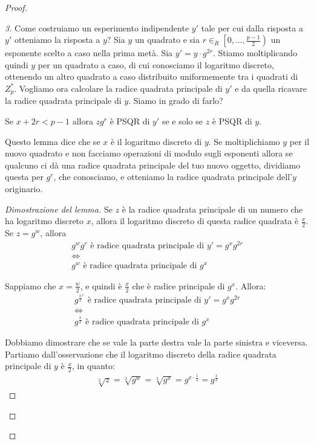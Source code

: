 \begin{proof}
\begin{proof}[3]
Come costruiamo un esperimento indipendente $y'$ tale per cui dalla risposta a $y'$ otteniamo la risposta a $y$? Sia $y$ un quadrato e sia $r \in_R \left[ 0, ..., \frac{p-1}{2}\right)$ un esponente scelto a caso nella prima metà. Sia $y' = y\cdot g^{2r}$. Stiamo moltiplicando quindi $y$ per un quadrato a caso, di cui conosciamo il logaritmo discreto, ottenendo un altro quadrato a caso distribuito uniformemente tra i quadrati di $Z_p^*$. Vogliamo ora calcolare la radice quadrata principale di $y'$ e da quella ricavare la radice quadrata principale di $y$. Siamo in grado di farlo? 
\begin{lemma}
Se $x + 2r < p-1$ allora $zg^r$ è PSQR di $y'$ se e solo se $z$ è PSQR di $y$.
\end{lemma}
\noindent Questo lemma dice che se $x$ è il logaritmo discreto di $y$. Se moltiplichiamo $y$ per il nuovo quadrato e non facciamo operazioni di modulo sugli esponenti allora se qualcuno ci dà una radice quadrata principale del tuo nuovo oggetto, dividiamo questa per $g^r$, che conosciamo, e otteniamo la radice quadrata principale dell'$y$ originario. 

\begin{proof}[Dimostrazione del lemma]
Se $z$ è la radice quadrata principale di un numero che ha logaritmo discreto $x$, allora il logaritmo discreto di questa radice quadrata è $\frac{x}{2}$. Se $z = g^w$, allora 
\begin{align*}
    g^wg^r \text{ è radice quadrata principale di } y' = g^xg^{2r}\\
    \Longleftrightarrow\\
    g^w \text{ è radice quadrata principale di } g^x
\end{align*}

\noindent Sappiamo che $x = \frac{w}{2}$, e quindi è $\frac{x}{2}$ che è radice principale di $g^x$. Allora: 
\begin{align*}
    g^\frac{x}{2}^r \text{ è radice quadrata principale di } y' = g^xg^{2r}\\
    \Longleftrightarrow\\
    g^\frac{x}{2} \text{ è radice quadrata principale di } g^x
\end{align*}



Dobbiamo dimostrare che se vale la parte destra vale la parte sinistra e viceversa. Partiamo dall'osservazione che il logaritmo discreto della radice quadrata principale di $y$ è $\frac{x}{2}$, in quanto:
\begin{align*}
    \sqrt[2]{z} = \sqrt[2]{g^w} = \sqrt[2]{g^x} = {g^{x \cdot \frac{1}{2}}} = g^\frac{x}{2}
\end{align*}


\end{proof}
\end{proof}
\end{proof}
